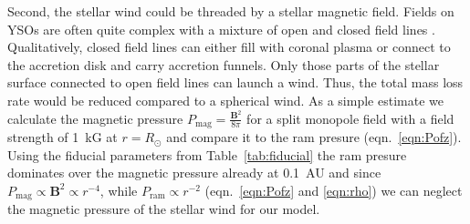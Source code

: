 \documentclass{emulateapj}
\begin{document}
Second, the stellar wind could be threaded by a stellar magnetic field. Fields on YSOs are often quite complex with a mixture of open and closed field lines \citep[e.g.][]{2011MNRAS.417..472D,2012MNRAS.425.2948D}.
Qualitatively, closed field lines can either fill with coronal plasma or connect to the accretion disk and carry accretion funnels. Only those parts of the stellar surface connected to open field lines can launch a wind. Thus, the total mass loss rate would be reduced compared to a spherical wind. 
As a simple estimate we calculate the magnetic pressure $P_{\textrm{mag}}=\frac{\boldsymbol{B}^2}{8 \pi}$ for a split monopole field with a field strength of 1~kG at $r=R_\odot$ and compare it to the ram presure (eqn.~\ref{eqn:Pofz}). Using the fiducial parameters from Table~\ref{tab:fiducial} the ram presure dominates over the magnetic pressure already at 0.1~AU and since $P_{\textrm{mag}} \propto \boldsymbol{B}^2 \propto r^{-4}$, while $P_{\textrm{ram}} \propto r^{-2}$ (eqn.~\ref{eqn:Pofz} and \ref{eqn:rho}) we can neglect the magnetic pressure of the stellar wind for our model.



\end{document}
